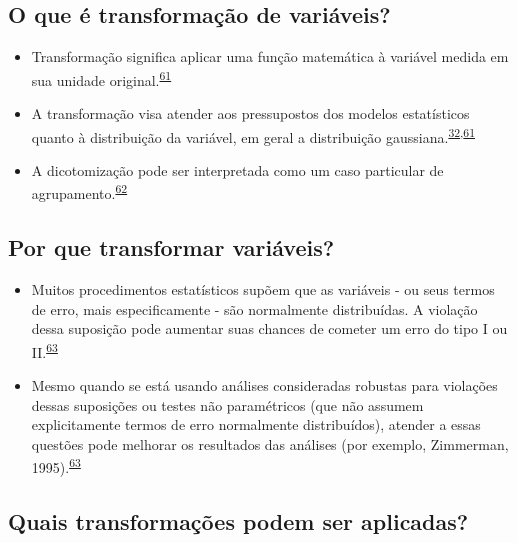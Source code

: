 \documentclass[
  a4paper,
]{book}
\begin{document}
\hypertarget{o-que-uxe9-transformauxe7uxe3o-de-variuxe1veis}{%
\subsection{O que é transformação de variáveis?}\label{o-que-uxe9-transformauxe7uxe3o-de-variuxe1veis}}

\begin{itemize}
\item
  Transformação significa aplicar uma função matemática à variável medida em sua unidade original.\textsuperscript{\protect\hyperlink{ref-Bland1996}{61}}
\item
  A transformação visa atender aos pressupostos dos modelos estatísticos quanto à distribuição da variável, em geral a distribuição gaussiana.\textsuperscript{\protect\hyperlink{ref-vetter2017}{32},\protect\hyperlink{ref-Bland1996}{61}}
\item
  A dicotomização pode ser interpretada como um caso particular de agrupamento.\textsuperscript{\protect\hyperlink{ref-Fedorov2009}{62}}
\end{itemize}

\hypertarget{por-que-transformar-variuxe1veis}{%
\subsection{Por que transformar variáveis?}\label{por-que-transformar-variuxe1veis}}

\begin{itemize}
\item
  Muitos procedimentos estatísticos supõem que as variáveis - ou seus termos de erro, mais especificamente - são normalmente distribuídas. A violação dessa suposição pode aumentar suas chances de cometer um erro do tipo I ou II.\textsuperscript{\protect\hyperlink{ref-osborne2010}{63}}
\item
  Mesmo quando se está usando análises consideradas robustas para violações dessas suposições ou testes não paramétricos (que não assumem explicitamente termos de erro normalmente distribuídos), atender a essas questões pode melhorar os resultados das análises (por exemplo, Zimmerman, 1995).\textsuperscript{\protect\hyperlink{ref-osborne2010}{63}}
\end{itemize}

\hypertarget{quais-transformauxe7uxf5es-podem-ser-aplicadas}{%
\subsection{Quais transformações podem ser aplicadas?}\label{quais-transformauxe7uxf5es-podem-ser-aplicadas}}
\end{document}

